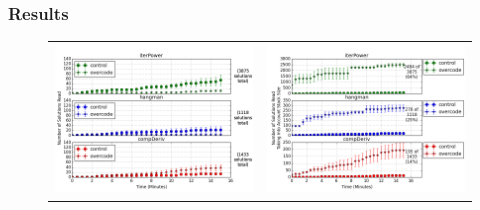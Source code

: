\documentclass[12pt,twoside]{mitthesis}
\providecommand{\DIFaddbegin}{} %
\providecommand{\DIFaddend}{} %
\providecommand{\DIFdelbegin}{} %
\providecommand{\DIFdelend}{} %
\begin{document}
{{{{{{{{{{\DIFdelbegin %
\DIFdelend \DIFaddbegin \subsubsection{Results} \DIFaddend \label{coverageResults}
\begin{figure}[b!]
\begin{tabular}{c | c}
\begin{minipage}{.5\linewidth}
\centering
\includegraphics[width=\linewidth]{Body/figures/overcode/prettyReadCoverage.png}
\end{minipage}
&
\begin{minipage}{.5\linewidth}
\centering
\includegraphics[width=\linewidth]{Body/figures/overcode/prettyPercentCoverage.png}

\end{minipage}
\end{tabular}
\end{figure}}}}}}}}}}}
\end{document}
